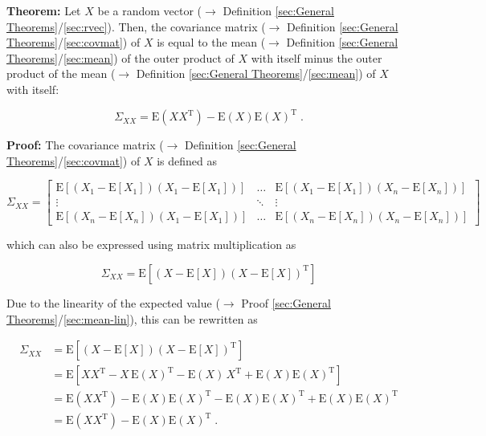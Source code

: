 \documentclass[a4paper,12pt,twoside]{book}
\begin{document}
\textbf{Theorem:} Let $X$ be a random vector ($\rightarrow$ Definition \ref{sec:General Theorems}/\ref{sec:rvec}). Then, the covariance matrix ($\rightarrow$ Definition \ref{sec:General Theorems}/\ref{sec:covmat}) of $X$ is equal to the mean ($\rightarrow$ Definition \ref{sec:General Theorems}/\ref{sec:mean}) of the outer product of $X$ with itself minus the outer product of the mean ($\rightarrow$ Definition \ref{sec:General Theorems}/\ref{sec:mean}) of $X$ with itself:

\begin{equation} \label{eq:covmat-mean-covmat-mean}
\Sigma_{XX} = \mathrm{E}(X X^\mathrm{T}) - \mathrm{E}(X) \mathrm{E}(X)^\mathrm{T} \; .
\end{equation}


\vspace{1em}
\textbf{Proof:} The covariance matrix ($\rightarrow$ Definition \ref{sec:General Theorems}/\ref{sec:covmat}) of $X$ is defined as

\begin{equation} \label{eq:covmat-mean-covmat1}
\Sigma_{XX} =
\begin{bmatrix}
\mathrm{E}\left[ (X_1-\mathrm{E}[X_1]) (X_1-\mathrm{E}[X_1]) \right] & \ldots & \mathrm{E}\left[ (X_1-\mathrm{E}[X_1]) (X_n-\mathrm{E}[X_n]) \right] \\
\vdots & \ddots & \vdots \\
\mathrm{E}\left[ (X_n-\mathrm{E}[X_n]) (X_1-\mathrm{E}[X_1]) \right] & \ldots & \mathrm{E}\left[ (X_n-\mathrm{E}[X_n]) (X_n-\mathrm{E}[X_n]) \right]
\end{bmatrix}
\end{equation}

which can also be expressed using matrix multiplication as

\begin{equation} \label{eq:covmat-mean-covmat2}
\Sigma_{XX} = \mathrm{E}\left[ (X-\mathrm{E}[X]) (X-\mathrm{E}[X])^\mathrm{T} \right]
\end{equation}

Due to the linearity of the expected value ($\rightarrow$ Proof \ref{sec:General Theorems}/\ref{sec:mean-lin}), this can be rewritten as

\begin{equation} \label{eq:covmat-mean-covmat-mean-qed}
\begin{split}
\Sigma_{XX} &= \mathrm{E}\left[ (X-\mathrm{E}[X]) (X-\mathrm{E}[X])^\mathrm{T} \right] \\
&= \mathrm{E}\left[ X X^\mathrm{T} - X \, \mathrm{E}(X)^\mathrm{T} - \mathrm{E}(X) \, X^\mathrm{T} + \mathrm{E}(X) \mathrm{E}(X)^\mathrm{T} \right] \\
&= \mathrm{E}(X X^\mathrm{T}) - \mathrm{E}(X) \mathrm{E}(X)^\mathrm{T} - \mathrm{E}(X) \mathrm{E}(X)^\mathrm{T} + \mathrm{E}(X) \mathrm{E}(X)^\mathrm{T} \\
&= \mathrm{E}(X X^\mathrm{T}) - \mathrm{E}(X) \mathrm{E}(X)^\mathrm{T} \; .
\end{split}
\end{equation}
\end{document}

